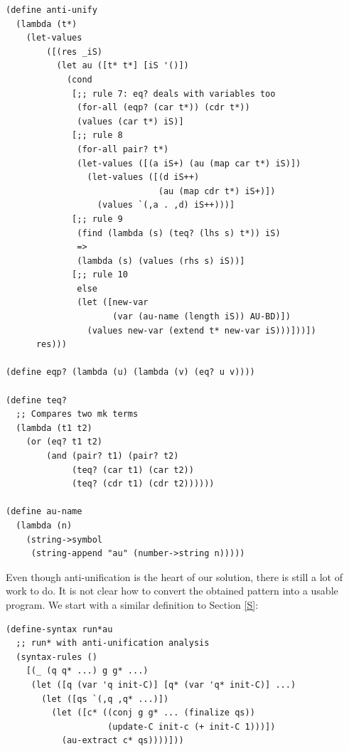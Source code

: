 \begin{lstlisting}
(define anti-unify
  (lambda (t*)
    (let-values
        ([(res _iS)
          (let au ([t* t*] [iS '()])
            (cond
             [;; rule 7: eq? deals with variables too
              (for-all (eqp? (car t*)) (cdr t*))
              (values (car t*) iS)]
             [;; rule 8
              (for-all pair? t*)
              (let-values ([(a iS+) (au (map car t*) iS)])
                (let-values ([(d iS++)
                              (au (map cdr t*) iS+)])
                  (values `(,a . ,d) iS++)))]
             [;; rule 9
              (find (lambda (s) (teq? (lhs s) t*)) iS)
              =>
              (lambda (s) (values (rhs s) iS))]
             [;; rule 10
              else
              (let ([new-var
                     (var (au-name (length iS)) AU-BD)])
                (values new-var (extend t* new-var iS)))]))])
      res)))

(define eqp? (lambda (u) (lambda (v) (eq? u v))))

(define teq?
  ;; Compares two mk terms
  (lambda (t1 t2)
    (or (eq? t1 t2)
        (and (pair? t1) (pair? t2)
             (teq? (car t1) (car t2))
             (teq? (cdr t1) (cdr t2))))))

(define au-name
  (lambda (n)
    (string->symbol
     (string-append "au" (number->string n)))))
\end{lstlisting}

Even though anti-unification is the heart of our solution, there is still a lot of work to do. It is not clear how to convert the obtained pattern into a usable program. We start with a similar definition to Section \ref{S}:
\begin{lstlisting}
(define-syntax run*au
  ;; run* with anti-unification analysis
  (syntax-rules ()
    [(_ (q q* ...) g g* ...)
     (let ([q (var 'q init-C)] [q* (var 'q* init-C)] ...)
       (let ([qs `(,q ,q* ...)])
         (let ([c* ((conj g g* ... (finalize qs))
                    (update-C init-c (+ init-C 1)))])
           (au-extract c* qs))))]))
\end{lstlisting}

